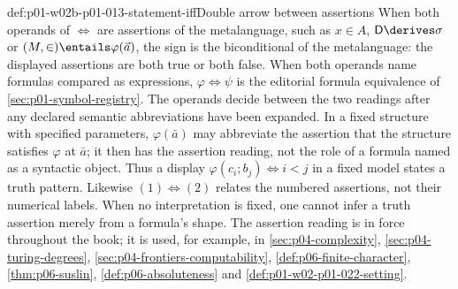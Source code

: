 \begin{hbconvention}{def:p01-w02b-p01-013-statement-iff}{Double arrow between assertions}
When both operands of \(\Leftrightarrow\) are assertions of the metalanguage,
such as \(x\in A\), \(\mathsf D\derives\sigma\) or
\((M,\in)\entails\varphi(\vec a)\), the sign is the biconditional of the
metalanguage: the displayed assertions are both true or both false.  When both
operands name formulas compared as expressions, \(\varphi\Leftrightarrow\psi\) is the editorial formula
equivalence of \cref{sec:p01-symbol-registry}.  The operands decide between
the two readings after any declared semantic abbreviations have been
expanded.  In a fixed structure with specified parameters,
\(\varphi(\bar a)\) may abbreviate the assertion that the structure
satisfies \(\varphi\) at \(\bar a\); it then has the assertion reading,
not the role of a formula named as a syntactic object.  Thus a display
\(\varphi(c_i;b_j)\Leftrightarrow i<j\) in a fixed model states a truth
pattern.  Likewise \((1)\Leftrightarrow(2)\) relates the numbered
assertions, not their numerical labels.  When no interpretation is fixed,
one cannot infer a truth assertion merely from a formula's shape.  The
assertion reading is in force throughout the book; it is used, for example, in
\cref{sec:p04-complexity}, \cref{sec:p04-turing-degrees},
\cref{sec:p04-frontiers-computability}, \cref{def:p06-finite-character},
\cref{thm:p06-suslin}, \cref{def:p06-absoluteness} and
\cref{def:p01-w02-p01-022-setting}.
\end{hbconvention}

